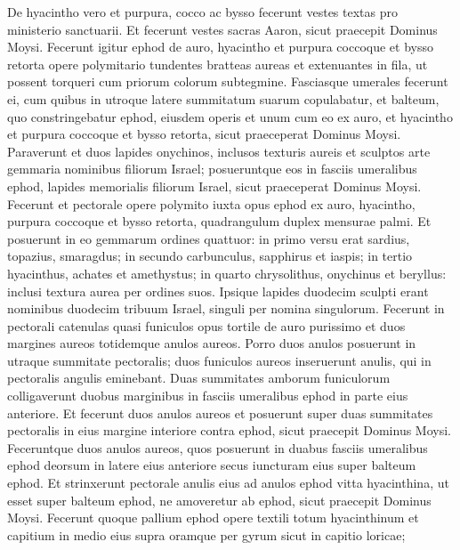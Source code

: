 \begin{biblechapter}  
\verse De hyacintho vero et purpura, cocco ac bysso fecerunt vestes textas pro ministerio sanctuarii. Et fecerunt vestes sacras Aaron, sicut praecepit Dominus Moysi. 
\verse Fecerunt igitur ephod de auro, hyacintho et purpura coccoque et bysso retorta 
\verse opere polymitario tundentes bratteas aureas et extenuantes in fila, ut possent torqueri cum priorum colorum subtegmine. 
\verse Fasciasque umerales fecerunt ei, cum quibus in utroque latere summitatum suarum copulabatur, 
\verse et balteum, quo constringebatur ephod, eiusdem operis et unum cum eo ex auro, et hyacintho et purpura coccoque et bysso retorta, sicut praeceperat Dominus Moysi.  
\verse Paraverunt et duos lapides onychinos, inclusos texturis aureis et sculptos arte gemmaria nominibus filiorum Israel; 
\verse posueruntque eos in fasciis umeralibus ephod, lapides memorialis filiorum Israel, sicut praeceperat Dominus Moysi. 
\verse Fecerunt et pectorale opere polymito iuxta opus ephod ex auro, hyacintho, purpura coccoque et bysso retorta, 
\verse quadrangulum duplex mensurae palmi.  
\verse Et posuerunt in eo gemmarum ordines quattuor: in primo versu erat sardius, topazius, smaragdus; 
\verse in secundo carbunculus, sapphirus et iaspis; 
\verse in tertio hyacinthus, achates et amethystus; 
\verse in quarto chrysolithus, onychinus et beryllus: inclusi textura aurea per ordines suos. 
\verse Ipsique lapides duodecim sculpti erant nominibus duodecim tribuum Israel, singuli per nomina singulorum. 
\verse Fecerunt in pectorali catenulas quasi funiculos opus tortile de auro purissimo 
\verse et duos margines aureos totidemque anulos aureos. Porro duos anulos posuerunt in utraque summitate pectoralis; 
\verse duos funiculos aureos inseruerunt anulis, qui in pectoralis angulis eminebant. 
\verse Duas summitates amborum funiculorum colligaverunt duobus marginibus in fasciis umeralibus ephod in parte eius anteriore. 
\verse Et fecerunt duos anulos aureos et posuerunt super duas summitates pectoralis in eius margine interiore contra ephod, sicut praecepit Dominus Moysi. 
\verse Feceruntque duos anulos aureos, quos posuerunt in duabus fasciis umeralibus ephod deorsum in latere eius anteriore secus iuncturam eius super balteum ephod. 
\verse Et strinxerunt pectorale anulis eius ad anulos ephod vitta hyacinthina, ut esset super balteum ephod, ne amoveretur ab ephod, sicut praecepit Dominus Moysi. 
\verse Fecerunt quoque pallium ephod opere textili totum hyacinthinum 
\verse et capitium in medio eius supra oramque per gyrum sicut in capitio loricae; 

\end{biblechapter}
